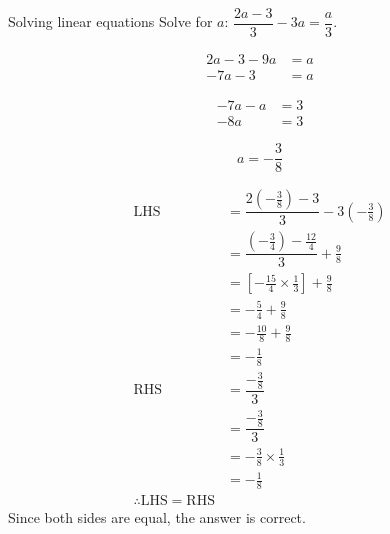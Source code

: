 \begin{wex}
{Solving linear equations}
{Solve for $a$: $\dfrac{2a-3}{3}-3a=\dfrac{a}{3}$.}
{
\begin{align*}
  2a-3 - 9a &= a \\
  -7a - 3 &= a
\end{align*}

\begin{align*}
  -7a -a &= 3 \\
  -8a &= 3
\end{align*}

\begin{equation*}
  a = -\dfrac{3}{8}
\end{equation*}

\begin{align*}
 \mbox{LHS} &= \dfrac{2(-\frac{3}{8}) - 3}{3} - 3(-\frac{3}{8})\\
  &=\dfrac{(-\frac{3}{4}) - \frac{12}{4}}{3} + \frac{9}{8}\\ 
  &=\left[-\frac{15}{4} \times \frac{1}{3}\right] + \frac{9}{8}\\ 
  &=-\frac{5}{4} + \frac{9}{8}\\ 
  &=-\frac{10}{8} + \frac{9}{8}\\ 
  &=-\frac{1}{8} \\

 \mbox{RHS} &= \dfrac{-\frac{3}{8}}{3} \\
  &= \dfrac{-\frac{3}{8}}{3} \\ 
  &= -\frac{3}{8} \times \frac{1}{3} \\ 
  &= -\frac{1}{8} \\ 

\therefore \mbox{LHS} = \mbox{RHS}

\end{align*}
Since both sides are equal, the answer is correct. 
}
\end{wex}

